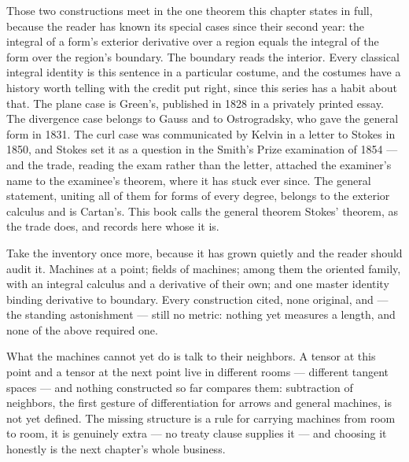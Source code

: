 Those two constructions meet in the one theorem this chapter states in
full, because the reader has known its special cases since their second
year: the integral of a form's exterior derivative over a region equals the
integral of the form over the region's boundary. The boundary reads the
interior. Every classical integral identity is this sentence in a
particular costume, and the costumes have a history worth telling with the
credit put right, since this series has a habit about that. The plane case
is Green's, published in 1828 in a privately printed essay. The divergence
case belongs to Gauss and to Ostrogradsky, who gave the general form in
1831. The curl case was communicated by Kelvin in a letter to Stokes in
1850, and Stokes set it as a question in the Smith's Prize examination of
1854 --- and the trade, reading the exam rather than the letter, attached
the examiner's name to the examinee's theorem, where it has stuck ever
since. The general statement, uniting all of them for forms of every
degree, belongs to the exterior calculus and is Cartan's. This book calls
the general theorem Stokes' theorem, as the trade does, and records here
whose it is.

Take the inventory once more, because it has grown quietly and the reader
should audit it. Machines at a point; fields of machines; among them the
oriented family, with an integral calculus and a derivative of their own;
and one master identity binding derivative to boundary. Every construction
cited, none original, and --- the standing astonishment --- still no
metric: nothing yet measures a length, and none of the above required one.

What the machines cannot yet do is talk to their neighbors. A tensor at
this point and a tensor at the next point live in different rooms ---
different tangent spaces --- and nothing constructed so far compares them:
subtraction of neighbors, the first gesture of differentiation for arrows
and general machines, is not yet defined. The missing structure is a rule
for carrying machines from room to room, it is genuinely extra --- no
treaty clause supplies it --- and choosing it honestly is the next
chapter's whole business.
